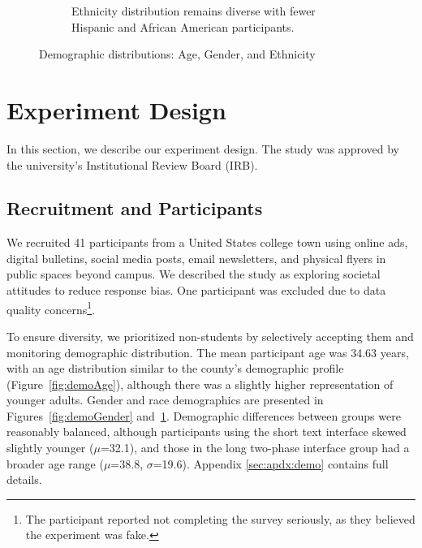\begin{figure}[ht!]
\begin{subfigure}{0.43\textwidth}
        \caption{Ethnicity distribution remains diverse with fewer Hispanic and African American participants.}
        \label{fig:demoEthnicity}
    \end{subfigure}

    \caption{Demographic distributions: Age, Gender, and Ethnicity}
    \label{fig:Demographics}
\end{figure}

\section{Experiment Design}
\label{sec:experiment}
In this section, we describe our experiment design. The study was approved by the university's Institutional Review Board (IRB).

\subsection{Recruitment and Participants}
We recruited 41 participants from a United States college town using online ads, digital bulletins, social media posts, email newsletters, and physical flyers in public spaces beyond campus. We described the study as exploring societal attitudes to reduce response bias. One participant was excluded due to data quality concerns\footnote{The participant reported not completing the survey seriously, as they believed the experiment was fake.}.

To ensure diversity, we prioritized non-students by selectively accepting them and monitoring demographic distribution. The mean participant age was 34.63 years, with an age distribution similar to the county's demographic profile (Figure~\ref{fig:demoAge}), although there was a slightly higher representation of younger adults. Gender and race demographics are presented in Figures~\ref{fig:demoGender} and~\ref{fig:demoEthnicity}. Demographic differences between groups were reasonably balanced, although participants using the short text interface skewed slightly younger ($\mu$=32.1), and those in the long two-phase interface group had a broader age range ($\mu$=38.8, $\sigma$=19.6). Appendix \ref{sec:apdx:demo} contains full details.

